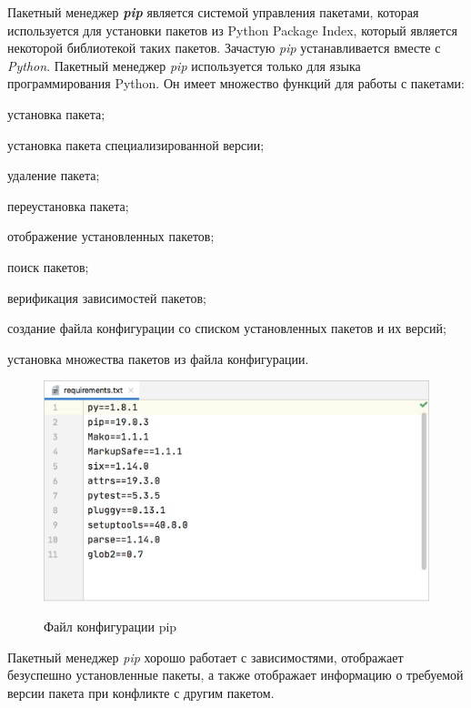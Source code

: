 Пакетный менеджер \textbf{\textit{pip}} является системой управления пакетами, которая используется для установки пакетов из Python Package Index, который является некоторой библиотекой таких пакетов. Зачастую \textit{pip} устанавливается вместе с \textit{Python}. Пакетный менеджер \textit{pip} используется только для языка программирования Python. 
Он имеет множество функций для работы с пакетами:

\begin{textitemize}
	\item установка пакета;
	\item установка пакета специализированной версии;
	\item удаление пакета;
	\item переустановка пакета;
	\item отображение установленных пакетов;
	\item поиск пакетов;
	\item верификация зависимостей пакетов;
	\item создание файла конфигурации со списком установленных пакетов и их версий;
	\item установка множества пакетов из файла конфигурации.
\end{textitemize}

\begin{figure}[H]
	\caption{Файл конфигурации pip}
	\includegraphics[scale=0.3]{author/part5/figures/pip.png}
	\label{fig:pip}
\end{figure}

Пакетный менеджер \textit{pip} хорошо работает с зависимостями, отображает безуспешно установленные пакеты, а также отображает информацию о требуемой версии пакета при конфликте с другим пакетом.

